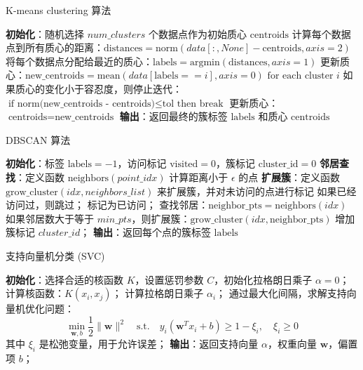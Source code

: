 \documentclass{article}
\begin{document}
\begin{algorithm}
\caption{K-means clustering 算法}
\textbf{初始化}：随机选择 $num\_clusters$ 个数据点作为初始质心 $\text{centroids}$\;
 {
    计算每个数据点到所有质心的距离：$\text{distances} = \text{norm}(data[:, None] - \text{centroids}, axis=2)$\;
    将每个数据点分配给最近的质心：$\text{labels} = \text{argmin}(\text{distances}, axis=1)$\;
    更新质心：$\text{new\_centroids} = \text{mean}(data[\text{labels} == i], axis=0) \text{ for each cluster $i$}$\;
    如果质心的变化小于容忍度，则停止迭代：$\text{if norm(new\_centroids - centroids)} \leq \text{tol} \text{ then break}$\;
    更新质心：$\text{centroids} = \text{new\_centroids}$\;
}
\textbf{输出}：返回最终的簇标签 $\text{labels}$ 和质心 $\text{centroids}$\;
\end{algorithm}

\begin{algorithm}
\caption{DBSCAN 算法}
\textbf{初始化}：标签 $\text{labels} = -1$，访问标记 $\text{visited} = 0$，簇标记 $\text{cluster\_id} = 0$\;
\textbf{邻居查找}：定义函数 $\text{neighbors}(point\_idx)$ 计算距离小于 $\epsilon$ 的点\;
\textbf{扩展簇}：定义函数 $\text{grow\_cluster}(idx, neighbors\_list)$ 来扩展簇，并对未访问的点进行标记\;
 {
    如果已经访问过，则跳过；
    标记为已访问；
    查找邻居：$\text{neighbor\_pts} = \text{neighbors}(idx)$\;
    如果邻居数大于等于 $min\_pts$，则扩展簇：$\text{grow\_cluster}(idx, \text{neighbor\_pts})$\;
    增加簇标记 $cluster\_id$；
}
\textbf{输出}：返回每个点的簇标签 $\text{labels}$\;
\end{algorithm}
\begin{algorithm}
\caption{支持向量机分类 (SVC)}
\textbf{初始化}：选择合适的核函数 $K$，设置惩罚参数 $C$，初始化拉格朗日乘子 $\alpha = 0$；
 {
    计算核函数：$K(x_i, x_j)$；
    计算拉格朗日乘子 $\alpha_i$；
    通过最大化间隔，求解支持向量机优化问题：
    \[
    \min_{\mathbf{w}, b} \frac{1}{2} \|\mathbf{w}\|^2 \quad \text{s.t.} \quad y_i (\mathbf{w}^T x_i + b) \geq 1 - \xi_i, \quad \xi_i \geq 0
    \]
    其中 $\xi_i$ 是松弛变量，用于允许误差；
}
\textbf{输出}：返回支持向量 $\alpha$，权重向量 $\mathbf{w}$，偏置项 $b$；
\end{algorithm}
\end{document}
